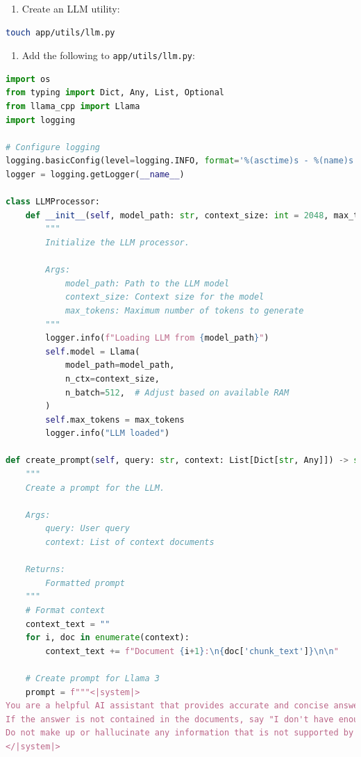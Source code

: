 \documentclass[
  screen,review,acmlarge]{acmart}
\newcommand{\passthrough}[1]{#1}
\providecommand{\tightlist}{%
  \setlength{\itemsep}{0pt}\setlength{\parskip}{0pt}}
\begin{document}
\begin{enumerate}
\def\labelenumi{\arabic{enumi}.}
\tightlist
\item
  Create an LLM utility:
\end{enumerate}

\begin{lstlisting}[language=bash]
touch app/utils/llm.py
\end{lstlisting}

\begin{enumerate}
\def\labelenumi{\arabic{enumi}.}
\setcounter{enumi}{1}
\tightlist
\item
  Add the following to \passthrough{\lstinline!app/utils/llm.py!}:
\end{enumerate}

\begin{lstlisting}[language=Python]
import os
from typing import Dict, Any, List, Optional
from llama_cpp import Llama
import logging

# Configure logging
logging.basicConfig(level=logging.INFO, format='%(asctime)s - %(name)s - %(levelname)s - %(message)s')
logger = logging.getLogger(__name__)

class LLMProcessor:
    def __init__(self, model_path: str, context_size: int = 2048, max_tokens: int = 512):
        """
        Initialize the LLM processor.
        
        Args:
            model_path: Path to the LLM model
            context_size: Context size for the model
            max_tokens: Maximum number of tokens to generate
        """
        logger.info(f"Loading LLM from {model_path}")
        self.model = Llama(
            model_path=model_path,
            n_ctx=context_size,
            n_batch=512,  # Adjust based on available RAM
        )
        self.max_tokens = max_tokens
        logger.info("LLM loaded")
    
def create_prompt(self, query: str, context: List[Dict[str, Any]]) -> str:
    """
    Create a prompt for the LLM.
    
    Args:
        query: User query
        context: List of context documents
        
    Returns:
        Formatted prompt
    """
    # Format context
    context_text = ""
    for i, doc in enumerate(context):
        context_text += f"Document {i+1}:\n{doc['chunk_text']}\n\n"
    
    # Create prompt for Llama 3
    prompt = f"""<|system|>
You are a helpful AI assistant that provides accurate and concise answers based on the provided context documents. 
If the answer is not contained in the documents, say "I don't have enough information to answer this question."
Do not make up or hallucinate any information that is not supported by the documents.
</|system|>


\end{lstlisting}
\end{document}
